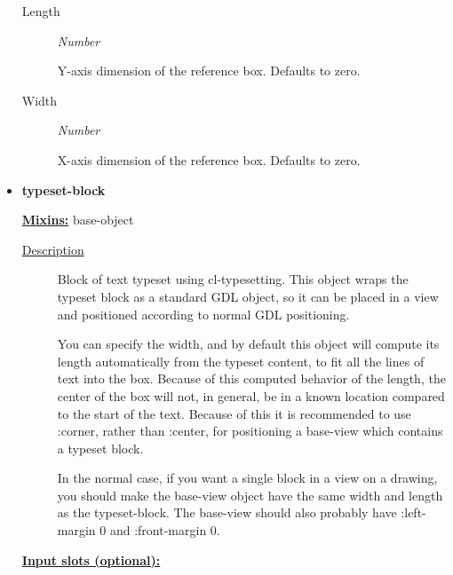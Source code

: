 \documentclass [11pt]{book}
\begin{document}
\begin{itemize}
\begin{description}
\item [Length]
\emph{Number}

 Y-axis dimension of the reference box. Defaults to zero.




\item [Width]
\emph{Number}

 X-axis dimension of the reference box. Defaults to zero.




\end{description}







\item {}
\label{prim:typeset-block}
\textbf{typeset-block}


\textbf{
\underline{Mixins:}} base-object





\begin{description}

\item [
\underline{Description}]


Block of text typeset using cl-typesetting. This object
wraps the typeset block as a standard GDL object, so it can be placed in a view and 
positioned according to normal GDL positioning.

You can specify the width, and by default this object will compute its length automatically 
from the typeset content, to fit all the lines of text into the box. Because of this 
computed behavior of the length, the center of the box will not, in general, be in a 
known location compared to the start of the text. Because of this it is recommended
to use :corner, rather than :center, for positioning a base-view which contains
a typeset block. 

In the normal case, if you want a single block in a view on a drawing, you should
make the base-view object have the same width and length as the typeset-block. The
base-view should also probably have :left-margin 0 and :front-margin 0.



\end{description}








\textbf{
\underline{Input slots (optional):}}


\end{itemize}
\end{document}
